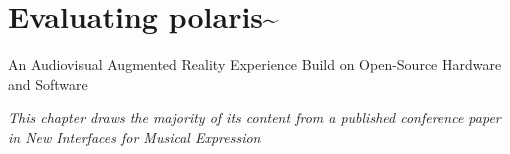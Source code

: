 \chapter{Evaluating polaris\textasciitilde{}}{An Audiovisual Augmented Reality Experience Build on Open-Source Hardware and Software}
\label{sec: polaris}
\epigraph{\emph{This chapter draws the majority of its content from a published conference paper in New Interfaces for Musical Expression}}{\citep[]{bilbow2022}}


